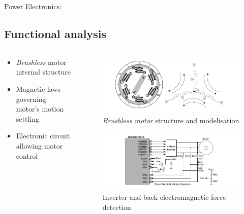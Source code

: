 \documentclass{beamer}
\begin{document}
\begin{frame}{Power Electronics:}
		\subsection[Func analysis]{Functional analysis}
		\begin{columns}[T]
	  		\begin{column}{0.4\textwidth}
				\begin{itemize}
					\item \textit{Brushless} motor internal structure
					\item Magnetic laws governing motor's motion settling
					\item Electronic circuit allowing motor control
				\end{itemize}
	  		\end{column}
	  		\begin{column}{0.6\textwidth}
	  			\vspace{-1em}
	  			\begin{figure}
	  				\begin{center}
	  					\includegraphics[height=0.3\textheight]{../Illus/struct_bldcm.png}
	  				\end{center}
	    			\caption{\textit{Brushless motor} structure and modelisation}
	    		\end{figure}
	    		\vspace{-2em}
	  			\begin{figure}
	  				\begin{center}
	  					\includegraphics[height=0.3\textheight]{../Illus/back_emf_scheme.png}
	  				\end{center}
	    			\caption{Inverter and back electromagnetic force detection}
	    		\end{figure}
	  		\end{column}
		\end{columns}

	\end{frame}	
		
\end{document}
